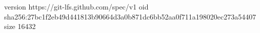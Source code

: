 version https://git-lfs.github.com/spec/v1
oid sha256:27bc1f2eb49d441813b90664d3a0b871dc6bb52aa0f711a198020ec273a54407
size 16432
